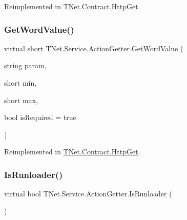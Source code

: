 Reimplemented in \mbox{\hyperlink{class_t_net_1_1_contract_1_1_http_get_a36c1698d3ab3e6dcf49dd46d7d3b3478}{T\+Net.\+Contract.\+Http\+Get}}.

\mbox{\label{class_t_net_1_1_service_1_1_action_getter_aebb2cb19e051911824a3b6c747904bdd}} 
\subsubsection{\texorpdfstring{Get\+Word\+Value()}{GetWordValue()}\hspace{0.1cm}{\footnotesize\ttfamily [2/2]}}
{\footnotesize\ttfamily virtual short T\+Net.\+Service.\+Action\+Getter.\+Get\+Word\+Value (\begin{DoxyParamCaption}\item[{string}]{param,  }\item[{short}]{min,  }\item[{short}]{max,  }\item[{bool}]{is\+Required = {\ttfamily true} }\end{DoxyParamCaption})\hspace{0.3cm}{\ttfamily [virtual]}}







Reimplemented in \mbox{\hyperlink{class_t_net_1_1_contract_1_1_http_get_a2ee823780a1ca44bcf516a8b1d380e59}{T\+Net.\+Contract.\+Http\+Get}}.

\mbox{\label{class_t_net_1_1_service_1_1_action_getter_af318ee8a4671b6000b036c4c57221458}} 
\subsubsection{\texorpdfstring{Is\+Runloader()}{IsRunloader()}}
{\footnotesize\ttfamily virtual bool T\+Net.\+Service.\+Action\+Getter.\+Is\+Runloader (\begin{DoxyParamCaption}{ }\end{DoxyParamCaption})\hspace{0.3cm}{\ttfamily [virtual]}}



